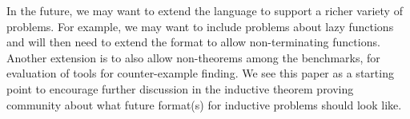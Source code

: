 \documentclass{llncs}
\begin{document}
In the future, we may want to extend the language to support a richer
variety of problems. For example,
we may want to include problems about lazy functions and will then need to extend the format to allow non-terminating functions.
Another extension is to also allow non-theorems among the benchmarks, for evaluation of tools for counter-example finding.  We see this paper as a starting point to encourage further discussion in the inductive theorem proving community about what future format(s) for inductive problems should look like.





\end{document}

